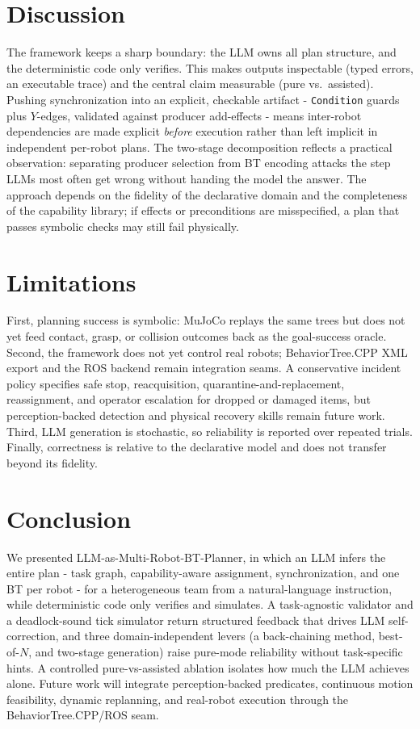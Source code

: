 \documentclass[journal]{IEEEtran}
\newcommand{\pred}[1]{\texttt{#1}}
\begin{document}


\section{Discussion}
The framework keeps a sharp boundary: the LLM owns all plan structure, and the deterministic code only verifies. This makes outputs inspectable (typed errors, an executable trace) and the central claim measurable (pure vs.\ assisted). Pushing synchronization into an explicit, checkable artifact - \pred{Condition} guards plus $Y$-edges, validated against producer add-effects - means inter-robot dependencies are made explicit \emph{before} execution rather than left implicit in independent per-robot plans. The two-stage decomposition reflects a practical observation: separating producer selection from BT encoding attacks the step LLMs most often get wrong without handing the model the answer. The approach depends on the fidelity of the declarative domain and the completeness of the capability library; if effects or preconditions are misspecified, a plan that passes symbolic checks may still fail physically.

\section{Limitations}
\label{sec:limitations}
First, planning success is symbolic: MuJoCo replays the same trees but does not yet feed contact, grasp, or collision outcomes back as the goal-success oracle. Second, the framework does not yet control real robots; BehaviorTree.CPP XML export and the ROS backend remain integration seams. A conservative incident policy specifies safe stop, reacquisition, quarantine-and-replacement, reassignment, and operator escalation for dropped or damaged items, but perception-backed detection and physical recovery skills remain future work. Third, LLM generation is stochastic, so reliability is reported over repeated trials. Finally, correctness is relative to the declarative model and does not transfer beyond its fidelity.

\section{Conclusion}
We presented LLM-as-Multi-Robot-BT-Planner, in which an LLM infers the entire plan - task graph, capability-aware assignment, synchronization, and one BT per robot - for a heterogeneous team from a natural-language instruction, while deterministic code only verifies and simulates. A task-agnostic validator and a deadlock-sound tick simulator return structured feedback that drives LLM self-correction, and three domain-independent levers (a back-chaining method, best-of-$N$, and two-stage generation) raise pure-mode reliability without task-specific hints. A controlled pure-vs-assisted ablation isolates how much the LLM achieves alone. Future work will integrate perception-backed predicates, continuous motion feasibility, dynamic replanning, and real-robot execution through the BehaviorTree.CPP/ROS seam.
\end{document}
